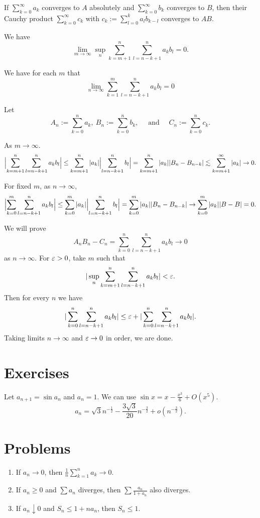 \documentclass{../note}
\begin{document}
\begin{prb}
If $\sum_{k=0}^\infty a_k$ converges to $A$ absolutely and $\sum_{k=0}^\infty b_k$ converges to $B$, then their Cauchy product $\sum_{k=0}^\infty c_k$ with $c_k:=\sum_{l=0}^ka_lb_{k-l}$ converges to $AB$.
\begin{parts}
\item We have
\[\lim_{m\to\infty}\sup_n\sum_{k=m+1}^n\sum_{l=n-k+1}^na_kb_l=0.\]
\item We have for each $m$ that
\[\lim_{n\to\infty}\sum_{k=1}^m\sum_{l=n-k+1}^na_kb_l=0\]
\end{parts}
\end{prb}
\begin{pf}
Let
\[A_n:=\sum_{k=0}^na_k,\ B_n:=\sum_{k=0}^nb_k,\quad\text{ and }\quad C_n:=\sum_{k=0}^nc_k.\]


As $m\to\infty$.
\[\Bigl|\sum_{k=m+1}^n\sum_{l=n-k+1}^na_kb_l\Bigr|\le\sum_{k=m+1}^n|a_k|\Bigl|\sum_{l=n-k+1}^nb_l\Bigr|=\sum_{k=m+1}^n|a_k||B_n-B_{n-k}|\lesssim\sum_{k=m+1}^\infty|a_k|\to0.\]

For fixed $m$, as $n\to\infty$,
\[\Bigl|\sum_{k=0}^m\sum_{l=n-k+1}^na_kb_l\Bigr|\le\sum_{k=0}^m|a_k|\Bigl|\sum_{l=n-k+1}^nb_l\Bigr|=\sum_{k=0}^m|a_k||B_n-B_{n-k}|\to\sum_{k=0}^m|a_k||B-B|=0.\]

We will prove
\[A_nB_n-C_n=\sum_{k=0}^n\sum_{l=n-k+1}^na_kb_l\to0\]
as $n\to\infty$.
For $\varepsilon>0$, take $m$ such that
\[|\sup_n\sum_{k=m+1}^n\sum_{l=n-k+1}^na_kb_l|<\varepsilon.\]
Then for every $n$ we have
\[|\sum_{k=0}^n\sum_{l=n-k+1}^na_kb_l|\le\varepsilon+|\sum_{k=0}^n\sum_{l=n-k+1}^na_kb_l|.\]
Taking limits $n\to\infty$ and $\varepsilon\to0$ in order, we are done.
\end{pf}




\section*{Exercises}
\begin{prb}

\end{prb}
\begin{prb}
Let $a_{n+1}=\sin a_n$ and $a_n=1$.
We can use $\sin x=x-\frac{x^3}6+O(x^5)$.
\[a_n=\sqrt3n^{-\frac12}-\frac{3\sqrt3}{20}n^{-\frac32}+o(n^{-\frac32}).\]
\end{prb}


\section*{Problems}
\begin{enumerate}
\item If $a_n\to0$, then $\frac1n\sum_{k=1}^na_k\to0$.
\item If $a_n\ge0$ and $\sum a_n$ diverges, then $\sum\frac{a_n}{1+a_n}$ also diverges.
\item If $a_n\downarrow0$ and $S_n\le1+na_n$, then $S_n\le1$.
\end{enumerate}
\end{document}
